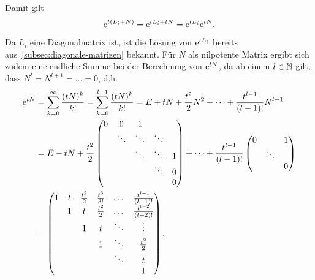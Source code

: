 Damit gilt
\begin{equation*}
    \mathrm{e}^{t (L_i + N)} = \mathrm{e}^{t L_i + t N} = \mathrm{e}^{t L_i} \mathrm{e}^{t N}.
\end{equation*}

Da $L_i$ eine Diagonalmatrix ist, ist die Lösung von $\mathrm{e}^{t L_i}$ bereits aus~\autoref{subsec:diagonale-matrizen} bekannt.
Für $N$ als nilpotente Matrix ergibt sich zudem eine endliche Summe bei der Berechnung von $\mathrm{e}^{t N}$,
da ab einem $l \in \mathbb{N}$ gilt, dass $N^l = N^{l+1} = \dots = 0$, d.h.
\begin{align*}
    \mathrm{e}^ {tN } &= \sum^\infty_{k=0} \frac{(t N)^k}{k!}
        = \sum^{l-1}_{k=0} \frac{(t N)^k}{k!}
        = E + t N + \frac{t^2}{2} N^2 + \dots + \frac{t^{l-1}}{(l-1)!} N^{l-1}\\
    &= E + t N +  \frac{t^2}{2} \begin{pmatrix}
                                0 & 0      & 1      &        & \\
                                  & \ddots & \ddots & \ddots & \\
                                  &        & \ddots & \ddots & 1\\
                                  &        &        & \ddots & 0\\
                                  &        &        &        & 0
                            \end{pmatrix}
        + \dots + \frac{t^{l-1}}{(l-1)!}  \begin{pmatrix}
                                        0 &        & 1\\
                                          & \ddots & \\
                                          &        & 0
                                    \end{pmatrix}\\
    &= \begin{pmatrix}
           1 & t & \frac{t^2}{2} & \frac{t^3}{3!} & \dots  & \frac{t^{l-1}}{(l-1)!}\\
           & 1 & t               & \frac{t^2}{2}  & \dots  & \frac{t^{l-2}}{(l-2)!}\\
           &   & 1               & t              & \ddots  & \vdots\\
           &   &                 & 1              & \ddots & \frac{t^2}{2}\\
           &   &                 &                & \ddots & t\\
           &   &                 &                &        & 1
    \end{pmatrix}.
\end{align*}

